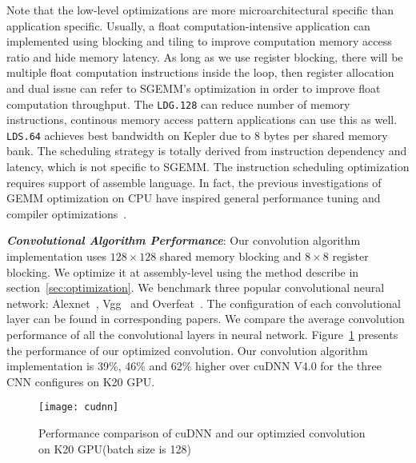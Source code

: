 Note that the low-level optimizations are more microarchitectural specific than application specific. 
Usually, a float computation-intensive application can implemented using
blocking and tiling to improve computation memory access ratio and hide memory latency. As long as we use
register blocking, there will be multiple float computation instructions inside
the loop, then register allocation and dual issue can refer to SGEMM's
optimization in order to improve float computation throughput. 
The {\tt LDG.128} can reduce number of memory instructions, continous memory
access pattern applications can use this as well.
{\tt LDS.64} achieves best bandwidth on Kepler due to 8 bytes per shared memory bank. 
The scheduling strategy is totally derived from instruction dependency and latency,
which is not specific to SGEMM. 
The instruction scheduling optimization requires support of assemble language.
In fact, the previous investigations of GEMM optimization on CPU have inspired
general performance tuning and compiler optimizations~\cite{lam1991cache}.  

{\em {\bf Convolutional Algorithm Performance}}:
Our convolution algorithm implementation uses $128\times128$ shared memory blocking and
$8\times8$ register blocking. We optimize it at assembly-level using the method describe in section~\ref{sec:optimization}.
We benchmark three popular convolutional neural network:
Alexnet~\cite{krizhevsky2012imagenet}, Vgg~\cite{simonyan2014very} and
Overfeat~\cite{sermanet2013overfeat}.  The configuration of each convolutional
layer can be found in corresponding papers.
We compare the average convolution performance of all the convolutional layers in neural network. 
Figure~\ref{fig:conv} presents the performance of our optimized convolution. %
Our convolution algorithm implementation is 39\%, 46\% and 62\% higher over cuDNN V4.0 for the three CNN configures on K20 GPU.

\begin{figure}[htbp]
\begin{center}
\texttt{[image: cudnn]}
    \caption{Performance comparison of cuDNN and our optimzied convolution on K20 GPU(batch size is 128)}
\label{fig:conv}
\end{center}
\end{figure}
